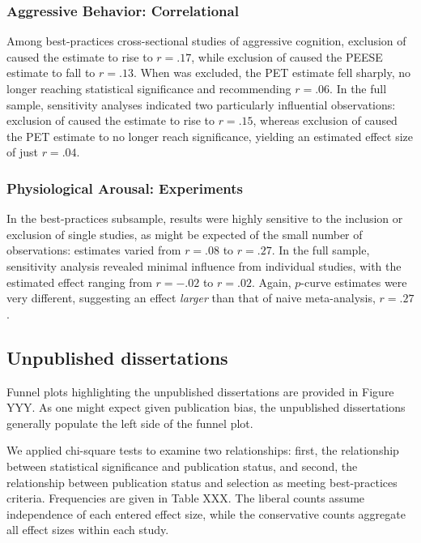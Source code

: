 \documentclass[man]{apa6}
\begin{document}
\subsubsection{Aggressive Behavior: Correlational}Among best-practices cross-sectional studies of aggressive cognition, exclusion of \citet{Yukawa:Sakamoto:2001} caused the estimate to rise to $r = .17$, while exclusion of \citet{Funk:etal:2003} caused the PEESE estimate to fall to $r = .13$. When \citet{Anderson:etal:2004} was excluded, the PET estimate fell sharply, no longer reaching statistical significance and recommending $r = .06$. In the full sample, sensitivity analyses indicated two particularly influential observations: exclusion of \citet{Santisteban:etal:2007} caused the estimate to rise to $r = .15$, whereas exclusion of \citet{Funk:etal:2003} caused the PET estimate to no longer reach significance, yielding an estimated effect size of just $r = .04$.

\subsubsection{Physiological Arousal: Experiments}In the best-practices subsample, results were highly sensitive to the inclusion or exclusion of single studies, as might be expected of the small number of observations: estimates varied from $r = .08$ to $r = .27$. In the full sample, sensitivity analysis revealed minimal influence from individual studies, with the estimated effect ranging from $r = -.02$ to $r = .02$. Again, $p$-curve estimates were very different, suggesting an effect {\em larger} than that of naive meta-analysis, $r = .27$.

\subsection{Unpublished dissertations}
Funnel plots highlighting the unpublished dissertations are provided in Figure YYY. As one might expect given publication bias, the unpublished dissertations generally populate the left side of the funnel plot. 

We applied chi-square tests to examine two relationships: first, the relationship between statistical significance and publication status, and second, the relationship between publication status and selection as meeting best-practices criteria. Frequencies are given in Table XXX. The liberal counts assume independence of each entered effect size, while the conservative counts aggregate all effect sizes within each study.
\end{document}
